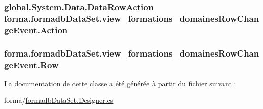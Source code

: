 \subsubsection[{\texorpdfstring{Action}{Action}}]{\setlength{\rightskip}{0pt plus 5cm}global.\+System.\+Data.\+Data\+Row\+Action forma.\+formadb\+Data\+Set.\+view\+\_\+formations\+\_\+domaines\+Row\+Change\+Event.\+Action\hspace{0.3cm}{\ttfamily [get]}}\hypertarget{classforma_1_1formadb_data_set_1_1view__formations__domaines_row_change_event_a03e1cb3034c7db85e395d6d4aaf21d26}{}\label{classforma_1_1formadb_data_set_1_1view__formations__domaines_row_change_event_a03e1cb3034c7db85e395d6d4aaf21d26}
\subsubsection[{\texorpdfstring{Row}{Row}}]{ forma.\+formadb\+Data\+Set.\+view\+\_\+formations\+\_\+domaines\+Row\+Change\+Event.\+Row\hspace{0.3cm}{\ttfamily [get]}}\hypertarget{classforma_1_1formadb_data_set_1_1view__formations__domaines_row_change_event_a95bda62f4c66fafb277c385ab9f65620}{}\label{classforma_1_1formadb_data_set_1_1view__formations__domaines_row_change_event_a95bda62f4c66fafb277c385ab9f65620}


La documentation de cette classe a été générée à partir du fichier suivant \+:\begin{DoxyCompactItemize}
\item 
forma/\hyperlink{formadb_data_set_8_designer_8cs}{formadb\+Data\+Set.\+Designer.\+cs}\end{DoxyCompactItemize}
